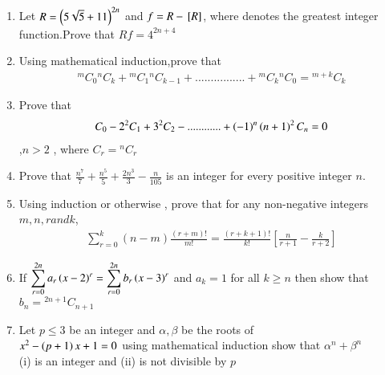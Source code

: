 \documentclass[journal,12pt,twocolumn]{IEEEtran}
\theoremstyle{remark}
\begin{document}
\begin{enumerate}
	    \item Let $ R =\left(5\sqrt{5}+11\right)^{2n} $ and $ f = R -{}\left[R\right] $, where \sbrak denotes the greatest integer function.Prove  that $ Rf =4^{2n+4 } $  \hfill {}


	    \item Using mathematical induction,prove that
		    \begin{align*} {}^mC_0{}^nC_k +{}^mC_1{}^nC_{k-1}+................+{}^mC_k{}^nC_0 ={}^{m+k}C_k \end{align*}  \hfill {}


	    \item Prove that \hfill{}
		    \begin{align*} 
		    C_0-2^2C_1+3^2C_2-............+\left(-1\right)^n\left(n+1\right)^2C_n =0
		    \end{align*},$n>2$ , where $C_r={}^nC_r$
		    

	    \item Prove that   $ \frac{n^7}{7}+\frac{n^5}{5}+\frac{2n^3}{3}-\frac{n}{105}$ is an integer for every positive integer $ n$. \hfill{}


	    \item Using induction or otherwise , prove that for any non-negative integers $m,n,r and k$,
		    \begin{align*} 
			    \sum_{r=0}^{k}(n-m)\frac{(r+m)!}{m!}= \frac{(r+k+1)!}{k!}[\frac{n}{r+1}-\frac{k}{r+2}]
		    \end{align*}
		     \hfill{} 

	    \item If $ \displaystyle\sum_{r=0}^{2n} a_r \left(x-2\right)^r=\displaystyle\sum_{r=0}^{2n}b_r \left(x-3\right)^r $ and $ a_k =1 $ for all $k \geq  n$ then show that $ b_n = {}^{2n+1}C_{n+1} $ \hfill {}

	    \item Let $ p \leq 3 $ be an integer and $ \alpha , \beta $ be  the roots of\\ $ x^2-\left(p+1\right)x+1=0 $ using mathematical induction show that $ \alpha^n  + \beta^n $\\ (i) is an integer and   
		        (ii) is not divisible by $ p $       \hfill{}
		    
 \end{enumerate}
    
    
\end{document}
